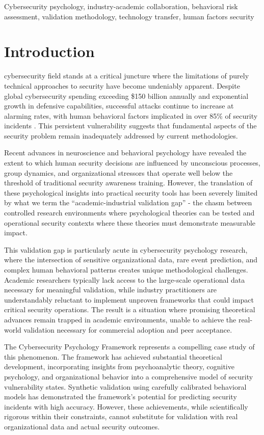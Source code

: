 \documentclass[10pt,twocolumn]{IEEEtran}
\begin{document}
\begin{IEEEkeywords}
Cybersecurity psychology, industry-academic collaboration, behavioral risk assessment, validation methodology, technology transfer, human factors security
\end{IEEEkeywords}

\section{Introduction}
 cybersecurity field stands at a critical juncture where the limitations of purely technical approaches to security have become undeniably apparent. Despite global cybersecurity spending exceeding \$150 billion annually and exponential growth in defensive capabilities, successful attacks continue to increase at alarming rates, with human behavioral factors implicated in over 85\% of security incidents \cite{verizon2023}. This persistent vulnerability suggests that fundamental aspects of the security problem remain inadequately addressed by current methodologies.

Recent advances in neuroscience and behavioral psychology have revealed the extent to which human security decisions are influenced by unconscious processes, group dynamics, and organizational stressors that operate well below the threshold of traditional security awareness training. However, the translation of these psychological insights into practical security tools has been severely limited by what we term the ``academic-industrial validation gap'' - the chasm between controlled research environments where psychological theories can be tested and operational security contexts where these theories must demonstrate measurable impact.

This validation gap is particularly acute in cybersecurity psychology research, where the intersection of sensitive organizational data, rare event prediction, and complex human behavioral patterns creates unique methodological challenges. Academic researchers typically lack access to the large-scale operational data necessary for meaningful validation, while industry practitioners are understandably reluctant to implement unproven frameworks that could impact critical security operations. The result is a situation where promising theoretical advances remain trapped in academic environments, unable to achieve the real-world validation necessary for commercial adoption and peer acceptance.

The Cybersecurity Psychology Framework represents a compelling case study of this phenomenon. The framework has achieved substantial theoretical development, incorporating insights from psychoanalytic theory, cognitive psychology, and organizational behavior into a comprehensive model of security vulnerability states. Synthetic validation using carefully calibrated behavioral models has demonstrated the framework's potential for predicting security incidents with high accuracy. However, these achievements, while scientifically rigorous within their constraints, cannot substitute for validation with real organizational data and actual security outcomes.
\end{document}
